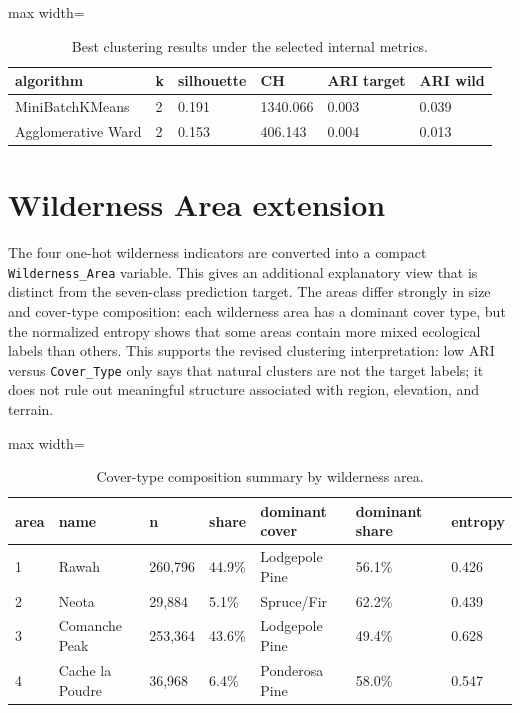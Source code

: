 \documentclass{article}
\begin{document}
\begin{table}[H]
\centering
\caption{Best clustering results under the selected internal metrics.}
\label{tab:cluster}
\small
\begin{adjustbox}{max width=\linewidth}
\begin{tabular}{llllll}
\toprule
algorithm & k & silhouette & CH & ARI target & ARI wild \\
\midrule
MiniBatchKMeans & 2 & 0.191 & 1340.066 & 0.003 & 0.039 \\
Agglomerative Ward & 2 & 0.153 & 406.143 & 0.004 & 0.013 \\
\bottomrule
\end{tabular}
\end{adjustbox}
\end{table}

\section{Wilderness Area extension}
The four one-hot wilderness indicators are converted into a compact \texttt{Wilderness\_Area} variable. This gives an additional explanatory view that is distinct from the seven-class prediction target. The areas differ strongly in size and cover-type composition: each wilderness area has a dominant cover type, but the normalized entropy shows that some areas contain more mixed ecological labels than others. This supports the revised clustering interpretation: low ARI versus \texttt{Cover\_Type} only says that natural clusters are not the target labels; it does not rule out meaningful structure associated with region, elevation, and terrain.

\begin{table}[H]
\centering
\caption{Cover-type composition summary by wilderness area.}
\label{tab:wilderness_summary}
\small
\begin{adjustbox}{max width=\linewidth}
\begin{tabular}{lllllll}
\toprule
area & name & n & share & dominant cover & dominant share & entropy \\
\midrule
1 & Rawah & 260,796 & 44.9\% & Lodgepole Pine & 56.1\% & 0.426 \\
2 & Neota & 29,884 & 5.1\% & Spruce/Fir & 62.2\% & 0.439 \\
3 & Comanche Peak & 253,364 & 43.6\% & Lodgepole Pine & 49.4\% & 0.628 \\
4 & Cache la Poudre & 36,968 & 6.4\% & Ponderosa Pine & 58.0\% & 0.547 \\
\bottomrule
\end{tabular}
\end{adjustbox}
\end{table}
\end{document}
